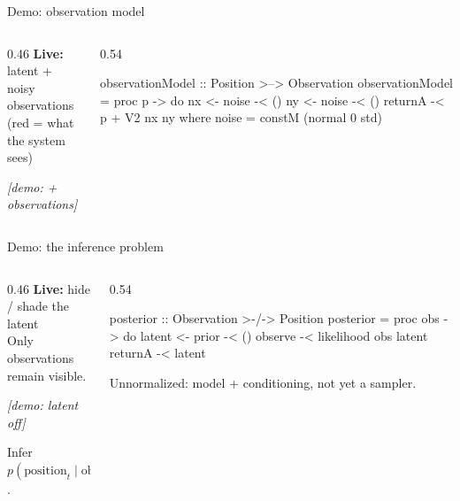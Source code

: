\begin{frame}[fragile]{Demo: observation model}
  \begin{columns}[T]
    \begin{column}{0.46\textwidth}
      \textbf{Live:} latent + noisy observations\\[0.3em]
      {\small (red = what the system sees)}
      \vspace{1.2em}

      {\scriptsize\textit{[demo: + observations]}}
    \end{column}
    \begin{column}{0.54\textwidth}
\begin{semiverbatim}
observationModel ::
  Position >--> Observation
observationModel = proc p -> do
  nx <- noise -< ()
  ny <- noise -< ()
  returnA -< p + V2 nx ny
  where
    noise = constM (normal 0 std)
\end{semiverbatim}
    \end{column}
  \end{columns}
\end{frame}

\begin{frame}[fragile]{Demo: the inference problem}
  \begin{columns}[T]
    \begin{column}{0.46\textwidth}
      \textbf{Live:} hide / shade the latent\\[0.3em]
      {\small Only observations remain visible.}
      \vspace{1.2em}

      {\scriptsize\textit{[demo: latent off]}}
      \vspace{0.8em}

      {\small Infer $p(\mathrm{position}_t \mid \mathrm{obs}_{\le t})$.}
    \end{column}
    \begin{column}{0.54\textwidth}
\begin{semiverbatim}
posterior ::
  Observation >-/-> Position
posterior = proc obs -> do
  latent <- prior -< ()
  observe -<
    likelihood obs latent
  returnA -< latent
\end{semiverbatim}
      \vspace{0.4em}
      {\small Unnormalized: model + conditioning, not yet a sampler.}
    \end{column}
  \end{columns}
\end{frame}

